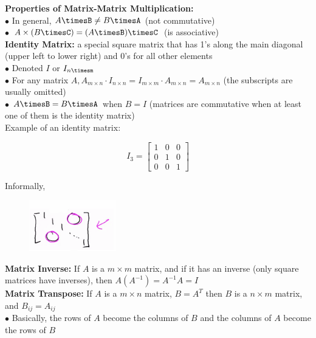 \documentclass{article}
\begin{document}
        \pagebreak
        \noindent \textbf{Properties of Matrix-Matrix Multiplication:} \\
        $\bullet$ In general, $A\timesB\not = B\timesA$ (not commutative) \\
        $\bullet$ $A\times(B\timesC)=(A\timesB)\timesC$ (is associative) \\

        \noindent \textbf{Identity Matrix:} a special square matrix that has 1's along the main diagonal
        (upper left to lower right) and 0's for all other elements \\
        $\bullet$ Denoted $I$ or $I_{n\timesm}$ \\
        $\bullet$ For any matrix $A,A_{m\times n}\cdot I_{n\times n}=I_{m\times m}\cdot A_{m\times n}=
        A_{m\times n}$ (the subscripts are usually omitted) \\
        $\bullet$ $A\timesB=B\timesA$ when $B=I$ (matrices are commutative when at least one of them is the
        identity matrix) \\

        \noindent Example of an identity matrix:

        \begin{equation*}
            I_3 =
            \begin{bmatrix}
                1 & 0 & 0 \\
                0 & 1 & 0 \\
                0 & 0 & 1
            \end{bmatrix}
        \end{equation*}

        \noindent Informally,

        \begin{figure}[hbt!]
            \centering
            \includegraphics[scale=1.2]{Resources/Identity2}
        \end{figure}

        \noindent \textbf{Matrix Inverse:} If $A$ is a $m\times m$ matrix, and if it has an inverse
        (only square matrices have inverses), then $A(A^{-1})=A^{-1}A=I$ \\

        \noindent \textbf{Matrix Transpose:} If $A$ is a $m\times n$ matrix, $B=A^T$ then $B$ is a $n\times m$
        matrix, and $B_{ij}=A_{ij}$ \\
        $\bullet$ Basically, the rows of $A$ become the columns of $B$ and the columns of $A$ become the
        rows of $B$
\end{document}
